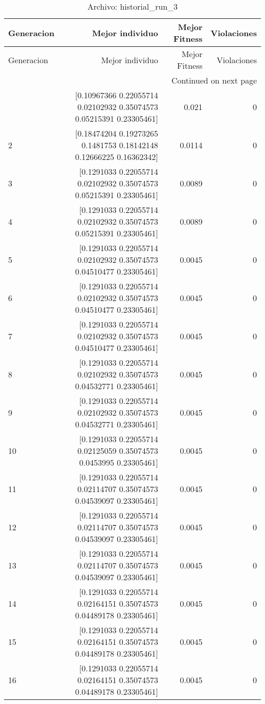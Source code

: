 \begin{longtable}{lrrr}
\caption{Archivo: historial\_run\_3}\label{tab:historial_run_3} \\
\toprule
Generacion & Mejor individuo & Mejor Fitness & Violaciones \\
\midrule
\endfirsthead
\toprule
Generacion & Mejor individuo & Mejor Fitness & Violaciones \\
\midrule
\endhead
\midrule
\multicolumn{4}{r}{Continued on next page} \\
\midrule
\endfoot
\bottomrule
\endlastfoot
1 & [0.10967366 0.22055714 0.02102932 0.35074573 0.05215391 0.23305461] & 0.021 & 0 \\
2 & [0.18474204 0.19273265 0.1481753  0.18142148 0.12666225 0.16362342] & 0.0114 & 0 \\
3 & [0.1291033  0.22055714 0.02102932 0.35074573 0.05215391 0.23305461] & 0.0089 & 0 \\
4 & [0.1291033  0.22055714 0.02102932 0.35074573 0.05215391 0.23305461] & 0.0089 & 0 \\
5 & [0.1291033  0.22055714 0.02102932 0.35074573 0.04510477 0.23305461] & 0.0045 & 0 \\
6 & [0.1291033  0.22055714 0.02102932 0.35074573 0.04510477 0.23305461] & 0.0045 & 0 \\
7 & [0.1291033  0.22055714 0.02102932 0.35074573 0.04510477 0.23305461] & 0.0045 & 0 \\
8 & [0.1291033  0.22055714 0.02102932 0.35074573 0.04532771 0.23305461] & 0.0045 & 0 \\
9 & [0.1291033  0.22055714 0.02102932 0.35074573 0.04532771 0.23305461] & 0.0045 & 0 \\
10 & [0.1291033  0.22055714 0.02125059 0.35074573 0.0453995  0.23305461] & 0.0045 & 0 \\
11 & [0.1291033  0.22055714 0.02114707 0.35074573 0.04539097 0.23305461] & 0.0045 & 0 \\
12 & [0.1291033  0.22055714 0.02114707 0.35074573 0.04539097 0.23305461] & 0.0045 & 0 \\
13 & [0.1291033  0.22055714 0.02114707 0.35074573 0.04539097 0.23305461] & 0.0045 & 0 \\
14 & [0.1291033  0.22055714 0.02164151 0.35074573 0.04489178 0.23305461] & 0.0045 & 0 \\
15 & [0.1291033  0.22055714 0.02164151 0.35074573 0.04489178 0.23305461] & 0.0045 & 0 \\
16 & [0.1291033  0.22055714 0.02164151 0.35074573 0.04489178 0.23305461] & 0.0045 & 0 \\

\end{longtable}
